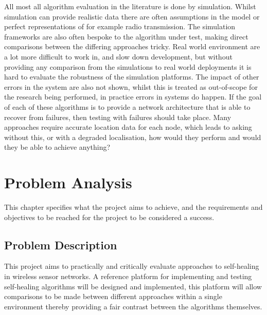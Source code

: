 \documentclass[authoryearcitations]{UoYCSproject}
\begin{document}

All most all algorithm evaluation in the literature is done by simulation. Whilst simulation can provide realistic data there are often assumptions in the model or perfect representations of for example radio transmission. The simulation frameworks are also often bespoke to the algorithm under test, making direct comparisons between the differing approaches tricky. Real world environment are a lot more difficult to work in, and slow down development, but without providing any comparison from the simulations to real world deployments it is hard to evaluate the robustness of the simulation platforms. The impact of other errors in the system are also not shown, whilst this is treated as out-of-scope for the research being performed, in practice errors in systems do happen. If the goal of each of these algorithms is to provide a network architecture that is able to recover from failures, then testing with failures should take place. Many approaches require accurate location data for each node, which leads to asking without this, or with a degraded localisation, how would they perform and would they be able to achieve anything?




\chapter{Problem Analysis}

This chapter specifies what the project aims to achieve, and the requirements and objectives to be reached for the project to be considered a success.

\section{Problem Description}
This project aims to practically and critically evaluate approaches to self-healing in wireless sensor networks. A reference platform for implementing and testing self-healing algorithms will be designed and implemented, this platform will allow comparisons to be made between different approaches within a single environment thereby providing a fair contrast between the algorithms themselves.
\end{document}
